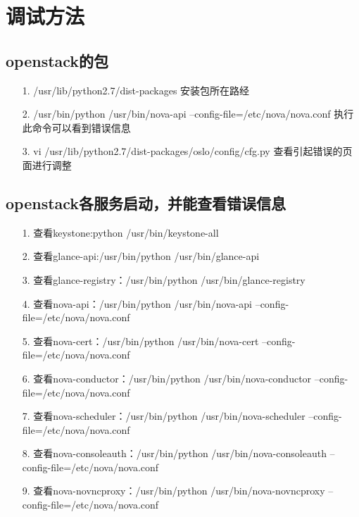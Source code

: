 \documentclass[a4paper,left=1.5cm,right=1.5cm,11pt]{article}
\begin{document}
\tableofcontents

\clearpage
\section{调试方法} 
\subsection{openstack的包}
    \begin{itemize}
        \item[1.]/usr/lib/python2.7/dist-packages  安装包所在路经
		\item[2.]/usr/bin/python /usr/bin/nova-api --config-file=/etc/nova/nova.conf 执行此命令可以看到错误信息
		\item[3.]vi /usr/lib/python2.7/dist-packages/oslo/config/cfg.py 查看引起错误的页面进行调整
    \end{itemize}
\subsection{openstack各服务启动，并能查看错误信息}
	\begin{itemize}
		\item[1.]查看keystone:python /usr/bin/keystone-all
		\item[2.]查看glance-api:/usr/bin/python /usr/bin/glance-api		
		\item[3.]查看glance-registry：/usr/bin/python /usr/bin/glance-registry 
		\item[4.]查看nova-api：/usr/bin/python /usr/bin/nova-api --config-file=/etc/nova/nova.conf
		\item[5.]查看nova-cert：/usr/bin/python /usr/bin/nova-cert --config-file=/etc/nova/nova.conf
		\item[6.]查看nova-conductor：/usr/bin/python /usr/bin/nova-conductor --config-file=/etc/nova/nova.conf
		\item[7.]查看nova-scheduler：/usr/bin/python /usr/bin/nova-scheduler --config-file=/etc/nova/nova.conf
		\item[8.]查看nova-consoleauth：/usr/bin/python /usr/bin/nova-consoleauth --config-file=/etc/nova/nova.conf
		\item[9.]查看nova-novncproxy：/usr/bin/python /usr/bin/nova-novncproxy --config-file=/etc/nova/nova.conf
	\end{itemize}
\end{document}
